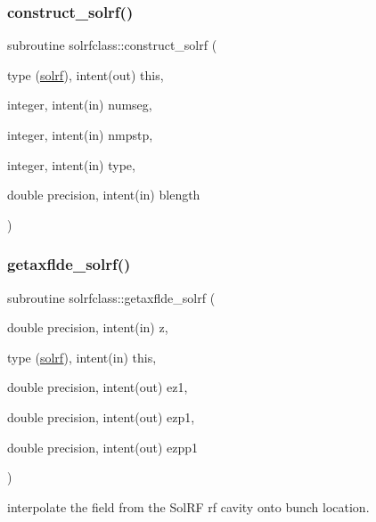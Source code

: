\subsubsection{\texorpdfstring{construct\_solrf()}{construct\_solrf()}}
{\footnotesize\ttfamily subroutine solrfclass\+::construct\+\_\+solrf (\begin{DoxyParamCaption}\item[{type (\mbox{\hyperlink{namespacesolrfclass_structsolrfclass_1_1solrf}{solrf}}), intent(out)}]{this,  }\item[{integer, intent(in)}]{numseg,  }\item[{integer, intent(in)}]{nmpstp,  }\item[{integer, intent(in)}]{type,  }\item[{double precision, intent(in)}]{blength }\end{DoxyParamCaption})}

\mbox{\label{namespacesolrfclass_a1033b422b682ef72ecc3b482c38b5065}} 
\subsubsection{\texorpdfstring{getaxflde\_solrf()}{getaxflde\_solrf()}}
{\footnotesize\ttfamily subroutine solrfclass\+::getaxflde\+\_\+solrf (\begin{DoxyParamCaption}\item[{double precision, intent(in)}]{z,  }\item[{type (\mbox{\hyperlink{namespacesolrfclass_structsolrfclass_1_1solrf}{solrf}}), intent(in)}]{this,  }\item[{double precision, intent(out)}]{ez1,  }\item[{double precision, intent(out)}]{ezp1,  }\item[{double precision, intent(out)}]{ezpp1 }\end{DoxyParamCaption})}



interpolate the field from the Sol\+RF rf cavity onto bunch location. 

